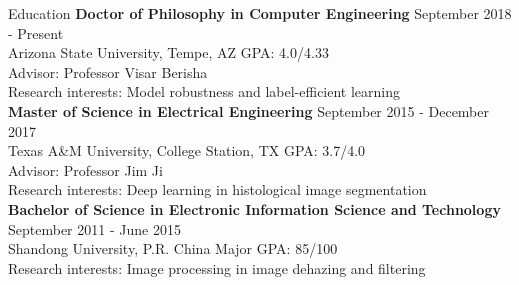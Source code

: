 \documentclass{resume} %
\begin{document}
  

\vspace{-0.3cm}
\begin{rSection}{Education}
{\bf Doctor of Philosophy in Computer Engineering} \hfill {September 2018 - Present}
\\
Arizona State University, Tempe, AZ \hspace{0.1in}GPA: 4.0/4.33\\
Advisor: Professor Visar Berisha\\
Research interests: Model robustness and label-efficient learning \\ 
{\bf Master of Science in Electrical Engineering} \hfill {September 2015 - December 2017}
\\ 
Texas A\&M University, College Station, TX \hspace{0.1in}GPA: 3.7/4.0
\\
Advisor: Professor Jim Ji\\
Research interests: Deep learning in histological image segmentation\\
{\bf Bachelor of Science in Electronic Information Science and Technology} \hfill {September 2011 - June 2015}
\\ 
Shandong University, P.R. China \hspace{0.1in}Major GPA: 85/100\\ 
Research interests:  Image processing in image dehazing and filtering 
\end{rSection} 
\vspace{-0.1cm}
\end{document}
